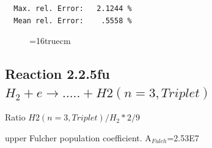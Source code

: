 \documentclass[12pt,dvips]{article}
\begin{document}
\begin{small}
\begin{verbatim}
  Max. rel. Error:   2.1244 %
  Mean rel. Error:    .5558 %

\end{verbatim}\end{small}
\begin{figure} \label{2.2.5fl}
\epsfxsize=16truecm
\end{figure}
\newpage

\subsection{
Reaction 2.2.5fu $H_2 + e \rightarrow .....+H2(n=3,Triplet)$}

Ratio $H2(n=3, Triplet)/H_2*2/9 $

upper Fulcher population coefficient. A$_{Fulch}$=2.53E7
\end{document}
